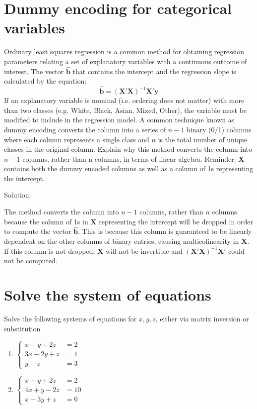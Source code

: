 \documentclass[12pt]{article}
\begin{document}
\section{Dummy encoding for categorical variables}

Ordinary least squares regression is a common method for obtaining regression parameters relating a set of explanatory variables with a continuous outcome of interest. The vector $\hat{\mathbf{b}}$ that contains the intercept and the regression slope is calculated by the equation:
\[ \hat{\mathbf{b}} = (\mathbf{X}'\mathbf{X})^{-1}\mathbf{X}'\mathbf{y}\]
If an explanatory variable is nominal (i.e. ordering does not matter) with more than two classes
(e.g. {White, Black, Asian, Mixed, Other}), the variable must be modified to include in the regression model.
A common technique known as dummy encoding converts the column into a series of $n - 1$ binary (0/1) columns where each column represents a single class and $n$ is the total number of unique classes in the original column. Explain why this method converts the column into $n - 1$ columns, rather than n columns, in terms of linear algebra. Reminder: $\mathbf{X}$ contains both the dummy encoded columns as well as a column of 1s representing the intercept.

Solution:

The method converts the column into $n - 1$ columns, rather than $n$ columns because the column of 1s in $\mathbf{X}$ representing the intercept will be dropped in order to compute the vector $\hat{\mathbf{b}}$. This is because this column is guaranteed to be linearly dependent on the other columns of binary entries, causing multicolinearity in $\mathbf{X}$. If this column is not dropped, $\mathbf{X}$ will not be invertible and $(\mathbf{X}'\mathbf{X})^{-1}\mathbf{X}'$ could not be computed. 

\section{Solve the system of equations}

Solve the following systems of equations for $x, y, z$, either via matrix inversion or substitution
\begin{enumerate}
    \item $\begin{cases}
        x+y+2z &= 2
        \\ 3x-2y + z &= 1
        \\ y-z &= 3
    \end{cases}$
    \item $\begin{cases}
        x-y+2z &= 2
        \\ 4x   + y - 2z &= 10
        \\ x+3y+z &= 0
    \end{cases}$
\end{enumerate}
\end{document}
